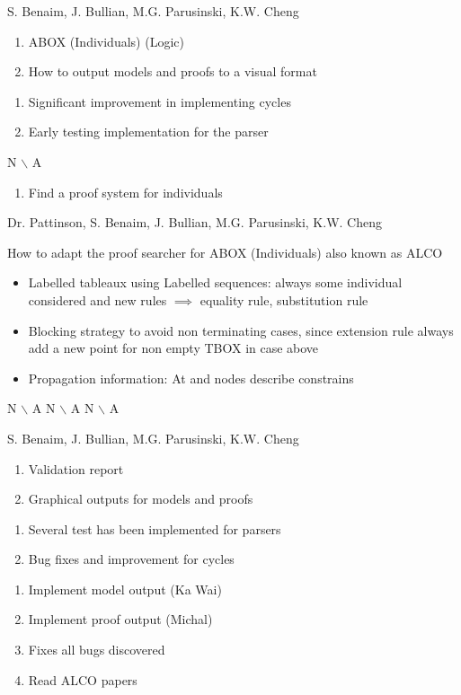 %
{S. Benaim, J. Bullian, M.G. Parusinski, K.W. Cheng}%
{\begin{enumerate}
\item ABOX (Individuals) (Logic)
\item How to output models and proofs to a visual format
\end{enumerate}
}%
{\begin{enumerate}
\item Significant improvement in implementing cycles
\item Early testing implementation for the parser
\end{enumerate}}%
{N $\backslash$ A}
{\begin{enumerate}
\item Find a proof system for individuals
\end{enumerate}}%

%
{Dr. Pattinson, S. Benaim, J. Bullian, M.G. Parusinski, K.W. Cheng}%
{How to adapt the proof searcher for ABOX (Individuals) also known as ALCO 
\begin{itemize}
\item Labelled tableaux using Labelled sequences: always some individual considered and new rules $\implies$ equality rule, substitution rule
\item Blocking strategy to avoid non terminating cases, since extension rule always add a new point for non empty TBOX in case above
\item Propagation information: At and nodes describe constrains
\end{itemize}
}%
{N $\backslash$ A}%
{N $\backslash$ A}
{N $\backslash$ A}%

%
{S. Benaim, J. Bullian, M.G. Parusinski, K.W. Cheng}%
{\begin{enumerate}
\item Validation report
\item Graphical outputs for models and proofs
\end{enumerate}
}%
{\begin{enumerate}
\item Several test has been implemented for parsers
\item Bug fixes and improvement for cycles
\end{enumerate}
}%
{}
{\begin{enumerate}
\item Implement model output (Ka Wai)
\item Implement proof output (Michal)
\item Fixes all bugs discovered
\item Read ALCO papers
\end{enumerate}}%

